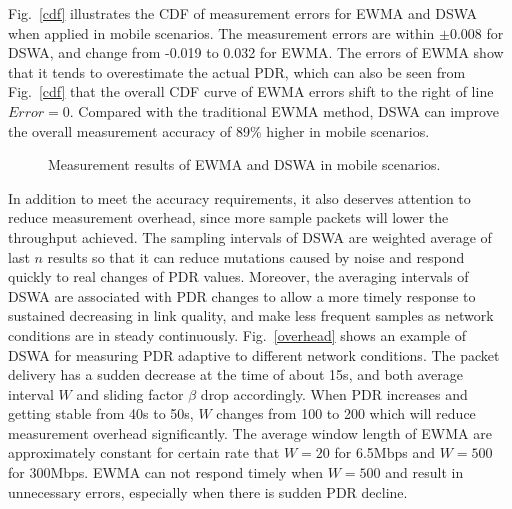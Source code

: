 \documentclass[journal,onecolumn,12pt]{IEEEtran}
\begin{document}
Fig.~\ref{cdf} illustrates the CDF of measurement errors for EWMA and DSWA when applied in mobile scenarios. The measurement errors are within $\pm$0.008 for DSWA, and change from -0.019 to 0.032 for EWMA. The errors of EWMA show that it tends to overestimate the actual PDR, which can also be seen from Fig.~\ref{cdf} that the overall CDF curve of EWMA errors shift to the right of line $Error=0$. Compared with the traditional EWMA method, DSWA can improve the overall measurement accuracy of 89\% higher in mobile scenarios.
\begin{figure}[!t]
\centerline{
}
\caption{Measurement results of EWMA and DSWA in mobile scenarios.}
\label{DSWA_error}
\end{figure}

In addition to meet the accuracy requirements, it also deserves attention to reduce measurement overhead, since more sample packets will lower the throughput achieved. The sampling intervals of DSWA are weighted average of last $n$ results so that it can reduce mutations caused by noise and respond quickly to real changes of PDR values. Moreover, the averaging intervals of DSWA are associated with PDR changes to allow a more timely response to sustained decreasing in link quality, and make less frequent samples as network conditions are in steady continuously. Fig.~\ref{overhead} shows an example of DSWA for measuring PDR adaptive to different network conditions. The packet delivery has a sudden decrease at the time of about 15s, and both average interval $W$ and sliding factor $\beta$ drop accordingly. When PDR increases and getting stable from 40s to 50s, $W$ changes from 100 to 200 which will reduce measurement overhead significantly. The average window length of EWMA are approximately constant for certain rate that $W=20$ for 6.5Mbps and $W=500$ for 300Mbps. EWMA can not respond timely when $W=500$ and result in unnecessary errors, especially when there is sudden PDR decline.
\end{document}
